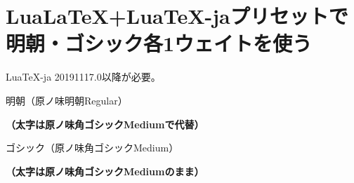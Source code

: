 \documentclass{ltjsarticle}
\begin{document}
\section{Lua\LaTeX +Lua\TeX -jaプリセットで明朝・ゴシック各1ウェイトを使う}

Lua\TeX -ja 20191117.0以降が必要。

\vspace{\baselineskip}

\rmfamily
\mcfamily
\mdseries
明朝（原ノ味明朝Regular）

\bfseries
（太字は原ノ味角ゴシックMediumで代替）

\sffamily
\gtfamily
\mdseries
ゴシック（原ノ味角ゴシックMedium）

\bfseries
（太字は原ノ味角ゴシックMediumのまま）
\end{document}
